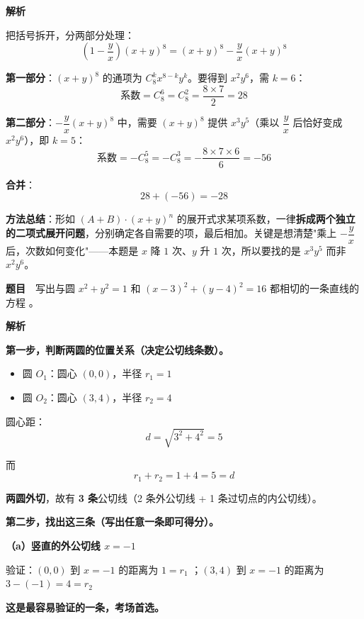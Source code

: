 \textbf{解析}

把括号拆开，分两部分处理：
\[\left(1-\frac yx\right)(x+y)^{8}=(x+y)^{8}-\frac yx(x+y)^{8}\]

\textbf{第一部分}：$(x+y)^{8}$ 的通项为 $C_8^{k}x^{8-k}y^{k}$。要得到 $x^{2}y^{6}$，需 $k=6$：
\[\text{系数}=C_8^{6}=C_8^{2}=\frac{8\times7}2=28\]

\textbf{第二部分}：$-\dfrac yx(x+y)^{8}$ 中，需要 $(x+y)^{8}$ 提供 $x^{3}y^{5}$（乘以 $\dfrac yx$ 后恰好变成 $x^{2}y^{6}$），即 $k=5$：
\[\text{系数}=-C_8^{5}=-C_8^{3}=-\frac{8\times7\times6}{6}=-56\]

\textbf{合并}：
\[28+(-56)=-28\]


\begin{gktip}
\textbf{方法总结}：形如 $\left(A+B\right)\cdot(x+y)^{n}$ 的展开式求某项系数，一律\textbf{拆成两个独立的二项式展开问题}，分别确定各自需要的项，最后相加。关键是想清楚"乘上 $-\dfrac yx$ 后，次数如何变化"——本题是 $x$ 降 $1$ 次、$y$ 升 $1$ 次，所以要找的是 $x^{3}y^{5}$ 而非 $x^{2}y^{6}$。
\end{gktip}

\par\medskip


\textbf{题目}　写出与圆 $x^{2}+y^{2}=1$ 和 $(x-3)^{2}+(y-4)^{2}=16$ 都相切的一条直线的方程 \gkblank{}。

\textbf{解析}

\textbf{第一步，判断两圆的位置关系（决定公切线条数）。}

\begin{itemize}
\item 圆 $O_1$：圆心 $(0,0)$，半径 $r_1=1$
\item 圆 $O_2$：圆心 $(3,4)$，半径 $r_2=4$
\end{itemize}

圆心距：
\[d=\sqrt{3^{2}+4^{2}}=5\]

而
\[r_1+r_2=1+4=5=d\]

\textbf{两圆外切}，故有 \textbf{3 条}公切线（2 条外公切线 + 1 条过切点的内公切线）。

\textbf{第二步，找出这三条（写出任意一条即可得分）。}

\textbf{（a）竖直的外公切线 $x=-1$}

验证：$(0,0)$ 到 $x=-1$ 的距离为 $1=r_1$ ；$(3,4)$ 到 $x=-1$ 的距离为 $3-(-1)=4=r_2$ 

\textbf{这是最容易验证的一条，考场首选。}

